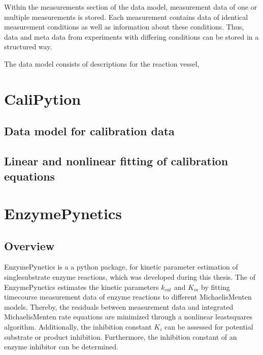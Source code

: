 \documentclass[letterpaper,10pt,english]{jupyterBook}
\begin{document}
\sphinxAtStartPar
Within the measurements section of the data model, measurement data of one or multiple measurements is stored. Each measurement contains data of identical measurement conditions as well as information about these conditions. Thus, data and meta data from experiments with differing conditions can be stored in a structured way.

\sphinxAtStartPar
The data model consists of descriptions for the reaction vessel,


\section{CaliPytion}
\label{\detokenize{methods:calipytion}}\label{\detokenize{methods:method-calipytion}}

\subsection{Data model for calibration data}
\label{\detokenize{methods:data-model-for-calibration-data}}

\subsection{Linear and non\sphinxhyphen{}linear fitting of calibration equations}
\label{\detokenize{methods:linear-and-non-linear-fitting-of-calibration-equations}}

\section{EnzymePynetics}
\label{\detokenize{methods:enzymepynetics}}\label{\detokenize{methods:method-enzymepynetics}}

\subsection{Overview}
\label{\detokenize{methods:overview}}
\sphinxAtStartPar
EnzymePynetics is a a python package, for kinetic parameter estimation of single\sphinxhyphen{}substrate enzyme reactions, which was developed during this thesis. The  of EnzymePynetics estimates the kinetic parameters \(k_{cat}\) and \(K_{m}\) by fitting time\sphinxhyphen{}course measurement data of enzyme reactions to different Michaelis\sphinxhyphen{}Menten models. Thereby, the residuals between measurement data and integrated Michaelis\sphinxhyphen{}Menten rate equations are minimized through a non\sphinxhyphen{}linear least\sphinxhyphen{}squares algorithm. Additionally, the inhibition constant \(K_{i}\) can be assessed for potential substrate or product inhibition. Furthermore, the inhibition constant of an enzyme inhibitor can be determined.
\end{document}

